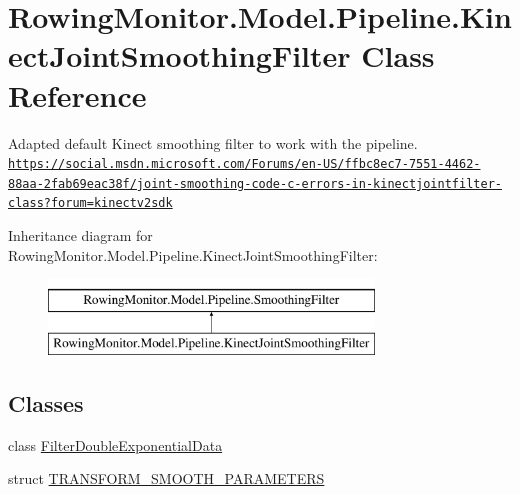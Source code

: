 \hypertarget{class_rowing_monitor_1_1_model_1_1_pipeline_1_1_kinect_joint_smoothing_filter}{}\section{Rowing\+Monitor.\+Model.\+Pipeline.\+Kinect\+Joint\+Smoothing\+Filter Class Reference}
\label{class_rowing_monitor_1_1_model_1_1_pipeline_1_1_kinect_joint_smoothing_filter}


Adapted default Kinect smoothing filter to work with the pipeline. \href{https://social.msdn.microsoft.com/Forums/en-US/ffbc8ec7-7551-4462-88aa-2fab69eac38f/joint-smoothing-code-c-errors-in-kinectjointfilter-class?forum=kinectv2sdk}{\tt https\+://social.\+msdn.\+microsoft.\+com/\+Forums/en-\/\+U\+S/ffbc8ec7-\/7551-\/4462-\/88aa-\/2fab69eac38f/joint-\/smoothing-\/code-\/c-\/errors-\/in-\/kinectjointfilter-\/class?forum=kinectv2sdk}  


Inheritance diagram for Rowing\+Monitor.\+Model.\+Pipeline.\+Kinect\+Joint\+Smoothing\+Filter\+:\begin{figure}[H]
\begin{center}
\leavevmode
\includegraphics[height=2.000000cm]{class_rowing_monitor_1_1_model_1_1_pipeline_1_1_kinect_joint_smoothing_filter}
\end{center}
\end{figure}
\subsection*{Classes}
\begin{DoxyCompactItemize}
\item 
class \hyperlink{class_rowing_monitor_1_1_model_1_1_pipeline_1_1_kinect_joint_smoothing_filter_1_1_filter_double_exponential_data}{Filter\+Double\+Exponential\+Data}
\item 
struct \hyperlink{struct_rowing_monitor_1_1_model_1_1_pipeline_1_1_kinect_joint_smoothing_filter_1_1_t_r_a_n_s_f_o9fb8ee9e37e15ee7ab8d318a72b8984e}{T\+R\+A\+N\+S\+F\+O\+R\+M\+\_\+\+S\+M\+O\+O\+T\+H\+\_\+\+P\+A\+R\+A\+M\+E\+T\+E\+RS}
\end{DoxyCompactItemize}
